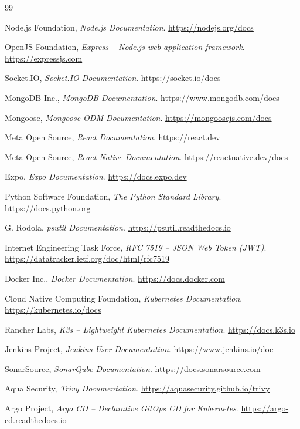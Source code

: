 \begin{thebibliography}{99}

 Node.js Foundation, \emph{Node.js Documentation}. \url{https://nodejs.org/docs}

 OpenJS Foundation, \emph{Express -- Node.js web application framework}. \url{https://expressjs.com}

 Socket.IO, \emph{Socket.IO Documentation}. \url{https://socket.io/docs}

 MongoDB Inc., \emph{MongoDB Documentation}. \url{https://www.mongodb.com/docs}

 Mongoose, \emph{Mongoose ODM Documentation}. \url{https://mongoosejs.com/docs}

 Meta Open Source, \emph{React Documentation}. \url{https://react.dev}

 Meta Open Source, \emph{React Native Documentation}. \url{https://reactnative.dev/docs}

 Expo, \emph{Expo Documentation}. \url{https://docs.expo.dev}

 Python Software Foundation, \emph{The Python Standard Library}. \url{https://docs.python.org}

 G. Rodola, \emph{psutil Documentation}. \url{https://psutil.readthedocs.io}

 Internet Engineering Task Force, \emph{RFC 7519 -- JSON Web Token (JWT)}. \url{https://datatracker.ietf.org/doc/html/rfc7519}

 Docker Inc., \emph{Docker Documentation}. \url{https://docs.docker.com}

 Cloud Native Computing Foundation, \emph{Kubernetes Documentation}. \url{https://kubernetes.io/docs}

 Rancher Labs, \emph{K3s -- Lightweight Kubernetes Documentation}. \url{https://docs.k3s.io}

 Jenkins Project, \emph{Jenkins User Documentation}. \url{https://www.jenkins.io/doc}

 SonarSource, \emph{SonarQube Documentation}. \url{https://docs.sonarsource.com}

 Aqua Security, \emph{Trivy Documentation}. \url{https://aquasecurity.github.io/trivy}

 Argo Project, \emph{Argo CD -- Declarative GitOps CD for Kubernetes}. \url{https://argo-cd.readthedocs.io}


\end{thebibliography}
